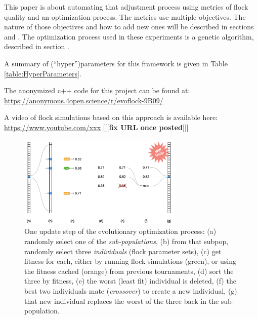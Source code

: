 \documentclass[letterpaper]{article}
\begin{document}
This paper is about automating that adjustment process using metrics of flock quality and an optimization process. The metrics use multiple objectives. The nature of those objectives and how to add new ones will be described in sections  and . The optimization process used in these experiments is a genetic algorithm, described in section .

A summary of (``hyper'')parameters for this framework is given in Table \ref{table:HyperParameters}.

The anonymized c++ code for this project can be found at:
\scriptsize
\url{https://anonymous.4open.science/r/evoflock-9B09/}
\normalsize

A video of flock simulations based on this approach is available here:
\scriptsize
\url{https://www.youtube.com/xxx}
\normalsize
[[[\textbf{fix URL once posted}]]]


\begin{figure}[t]
    \centering
    \includegraphics[width=0.7\textwidth]{images/temp_evo_update.png}
    \caption{One update step of the evolutionary optimization process: (a) randomly select one of the \textit{sub-populations}, (b) from that subpop, randomly select three \textit{individuals} (flock parameter sets), (c) get fitness for each, either by running flock simulations (green), or using the fitness cached (orange) from previous tournaments, (d) sort the three by fitness, (e) the worst (least fit) individual is deleted, (f) the best two individuals mate (\textit{crossover}) to create a new individual, (g) that new individual replaces the worst of the three back in the sub-population.}
    \label{fig:temp_evo_update}
\end{figure}

\end{document}
